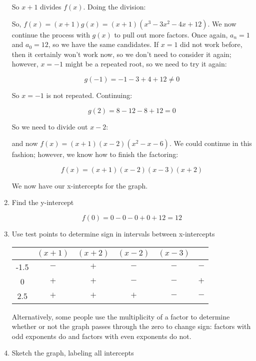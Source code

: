 \documentclass[letterpaper, 12pt]{article}
\begin{document}
\begin{enumerate}
So $x+1$ divides $f(x)$. Doing the division:

\bigskip


\bigskip

So, $f(x)=(x+1)g(x)=(x+1)(x^3-3x^2-4x+12)$. We now continue the process with
$g(x)$ to pull out more factors. Once again, $a_n=1$ and $a_0=12$, so we have
the same candidates. If $x=1$ did not work before, then it certainly won't work
now, so we don't need to consider it again; however, $x=-1$ might be a repeated
root, so we need to try it again:

\[g(-1)=-1-3+4+12\ne0\]

So $x=-1$ is not repeated. Continuing:

\[g(2)=8-12-8+12=0\]

So we need to divide out $x-2$:

\bigskip


\bigskip

and now $f(x)=(x+1)(x-2)(x^2-x-6)$. We could continue in this fashion; however,
we know how to finish the factoring:

\[f(x)=(x+1)(x-2)(x-3)(x+2)\]

We now have our x-intercepts for the graph.

\item{Find the y-intercept}

\[f(0)=0-0-0+0+12=12\]

\item{Use test points to determine sign in intervals between x-intercepts}

\begin{tabular}{c|cccc|c}
 & $(x+1)$ & $(x+2)$ & $(x-2)$ & $(x-3)$ & \\
\hline
-1.5 & $-$ & $+$ & $-$ & $-$ & $-$ \\
0 & $+$ & $+$ & $-$ & $-$ & $+$ \\
2.5 & $+$ & $+$ & $+$ & $-$ & $-$ \\
\end{tabular}

\bigskip

Alternatively, some people use the multiplicity of a factor to determine whether
or not the graph passes through the zero to change sign: factors with odd
exponents do and factors with even exponents do not.

\item{Sketch the graph, labeling all intercepts}

\begin{center}
\end{center}

\end{enumerate}
\end{document}
